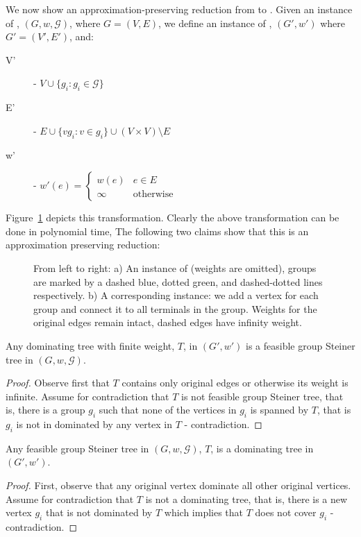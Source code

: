 We now show an approximation-preserving reduction from \ProbGroup{} to
\Prob{}.
Given an instance of \ProbGroup{}, $(G, w, \mathcal{G})$, where $G = (V, E)$, 
we define an instance of \Prob{},
$(G', w')$ where $G' = (V', E')$, and:
\begin{description}
\item[V'] - $V \cup \{g_i : g_i \in \mathcal{G}\}$
\item[E'] - $E \cup \{vg_i : v \in g_i\} \cup (V \times V) \setminus E$
\item[w'] - $
w'(e) = 
\begin{cases}
w(e) 	& e \in E
\\
\infty & \text{otherwise}
\end{cases}
$
\end{description}
Figure~\ref{fig:prob-geq-group} depicts this transformation.
Clearly the above transformation can be done in polynomial time,
The following two claims show that this is an approximation preserving reduction:

\begin{figure}
\begin{center}

\end{center}
\caption{\label{fig:prob-geq-group}
From left to right:
a) An instance of \ProbGroup{} (weights are omitted), 
groups are marked by a dashed blue, dotted green, and dashed-dotted lines respectively.  
b) A corresponding \Prob{} instance: we add a vertex for each group and connect it 
to all terminals in the group.
Weights for the original edges remain intact, dashed edges have infinity weight.   
}
\end{figure}

\begin{claim}
Any dominating tree with finite weight, $T$, in $(G', w')$ is a feasible group Steiner tree in 
$(G, w, \mathcal{G})$.
\end{claim}

\begin{proof}
Observe first that $T$ contains only original edges or otherwise its weight is infinite.  
Assume for contradiction that $T$ is not feasible group Steiner tree, that is, there is 
a group $g_i$ such that none of the vertices in $g_i$ is spanned by $T$, that is $g_i$
is not in dominated by any vertex in $T$ - contradiction. 
\end{proof}
 
\begin{claim}
Any feasible group Steiner tree in $(G, w, \mathcal{G})$, $T$, is a dominating tree
in $(G', w')$.
\end{claim}

\begin{proof}
First, observe that any original vertex dominate all other original vertices.
Assume for contradiction that $T$ is not a dominating tree, that is, there is 
a new vertex $g_i$ that is not dominated by $T$ which implies that 
$T$ does not cover $g_i$ - contradiction. 
\end{proof}